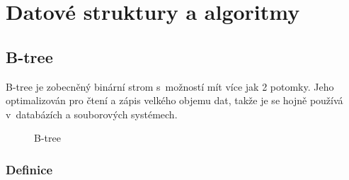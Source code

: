 \chapter{Datové struktury a algoritmy}


\section{B-tree}

B-tree\cite{Cormen:2001:IA:580470} je zobecněný binární strom s~možností
mít více jak 2 potomky. Jeho optimalizován pro čtení a zápis velkého
objemu dat, takže je se hojně používá v~databázích a souborových
systémech.

\begin{figure}[t]
\centering{}\caption{B-tree}
\end{figure}



\subsection{Definice}

